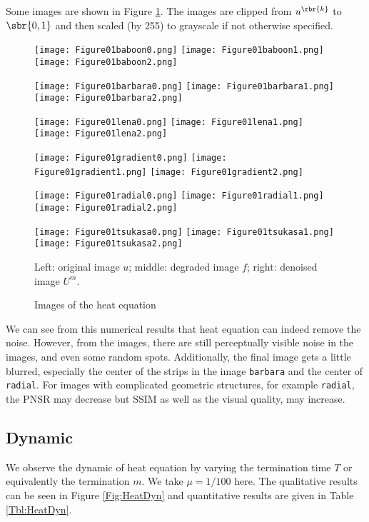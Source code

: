 \documentclass[english, nochinese]{pnote}
\begin{document}
Some images are shown in Figure \ref{Fig:Heat}. The images are clipped from $u^{\rbr{k}}$ to $ \sbr{ 0, 1 } $ and then scaled (by 255) to grayscale if not otherwise specified.

\begin{figure}[htbp]
{
\centering

\texttt{[image: Figure01baboon0.png]}
\texttt{[image: Figure01baboon1.png]}
\texttt{[image: Figure01baboon2.png]}

\texttt{[image: Figure01barbara0.png]}
\texttt{[image: Figure01barbara1.png]}
\texttt{[image: Figure01barbara2.png]}

\texttt{[image: Figure01lena0.png]}
\texttt{[image: Figure01lena1.png]}
\texttt{[image: Figure01lena2.png]}

\texttt{[image: Figure01gradient0.png]}
\texttt{[image: Figure01gradient1.png]}
\texttt{[image: Figure01gradient2.png]}

\texttt{[image: Figure01radial0.png]}
\texttt{[image: Figure01radial1.png]}
\texttt{[image: Figure01radial2.png]}

\texttt{[image: Figure01tsukasa0.png]}
\texttt{[image: Figure01tsukasa1.png]}
\texttt{[image: Figure01tsukasa2.png]}

\caption{Images of the heat equation}
\label{Fig:Heat}
}
{
\footnotesize Left: original image $u$; middle: degraded image $f$; right: denoised image $U^m$.
}
\end{figure}

We can see from this numerical results that heat equation can indeed remove the noise. However, from the images, there are still perceptually visible noise in the images, and even some random spots. Additionally, the final image gets a little blurred, especially the center of the strips in the image \verb"barbara" and the center of \verb"radial". For images with complicated geometric structures, for example \verb"radial", the PNSR may decrease but SSIM as well as the visual quality, may increase.

\subsection{Dynamic}

We observe the dynamic of heat equation by varying the termination time $T$ or equivalently the termination $m$. We take $ \mu = 1 / 100 $ here. The qualitative results can be seen in Figure \ref{Fig:HeatDyn} and quantitative results are given in Table \ref{Tbl:HeatDyn}.
\end{document}
